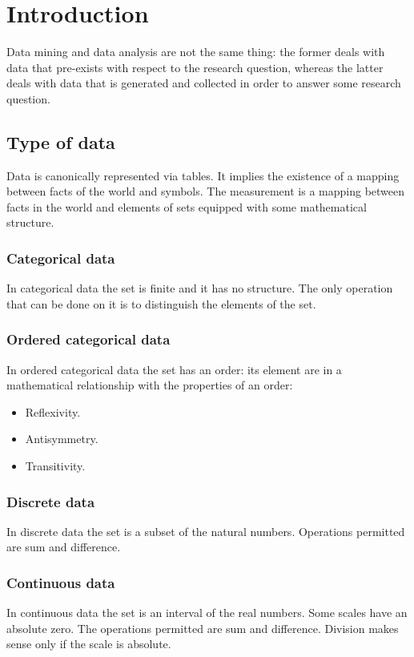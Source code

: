 \chapter{Introduction}
Data mining and data analysis are not the same thing: the former deals with data that pre-exists with respect to the research question, whereas the latter deals with data that is generated and collected in order to answer some research question.

\section{Type of data}
Data is canonically represented via tables.
It implies the existence of a mapping between facts of the world and symbols.
The measurement is a mapping between facts in the world and elements of sets equipped with some mathematical structure.

	\subsection{Categorical data}
	In categorical data the set is finite and it has no structure.
	The only operation that can be done on it is to distinguish the elements of the set.

	\subsection{Ordered categorical data}
	In ordered categorical data the set has an order: its element are in a mathematical relationship with the properties of an order:

	\begin{multicols}{3}
		\begin{itemize}
			\item Reflexivity.
			\item Antisymmetry.
			\item Transitivity.
		\end{itemize}
	\end{multicols}

	\subsection{Discrete data}
	In discrete data the set is a subset of the natural numbers.
	Operations permitted are sum and difference.

	\subsection{Continuous data}
	In continuous data the set is an interval of the real numbers.
	Some scales have an absolute zero.
	The operations permitted are sum and difference.
	Division makes sense only if the scale is absolute.

